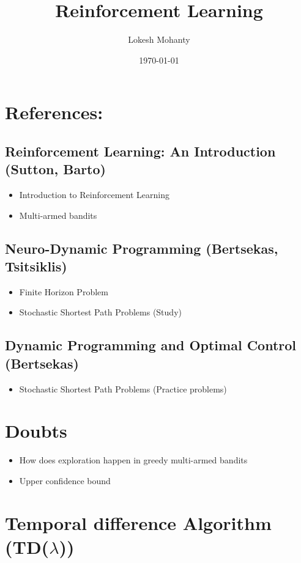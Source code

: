 \documentclass[11pt]{article}
\author{Lokesh Mohanty}
\date{\today}
\title{Reinforcement Learning}
\begin{document}
\maketitle
\tableofcontents


\section{References:}
\label{sec:orgba8d025}
\subsection{Reinforcement Learning: An Introduction (Sutton, Barto)}
\label{sec:org7fdb8dc}
\begin{itemize}
\item Introduction to Reinforcement Learning
\item Multi-armed bandits
\end{itemize}

\subsection{Neuro-Dynamic Programming (Bertsekas, Tsitsiklis)}
\label{sec:orgc0d20be}
\begin{itemize}
\item Finite Horizon Problem
\item Stochastic Shortest Path Problems (Study)
\end{itemize}

\subsection{Dynamic Programming and Optimal Control (Bertsekas)}
\label{sec:org215cadb}
\begin{itemize}
\item Stochastic Shortest Path Problems (Practice problems)
\end{itemize}

\section{Doubts}
\label{sec:org80f7640}
\begin{itemize}
\item How does exploration happen in greedy multi-armed bandits
\item Upper confidence bound
\end{itemize}

\section{Temporal difference Algorithm (TD(\(\lambda\)))}
\label{sec:org0835c3a}
\end{document}

